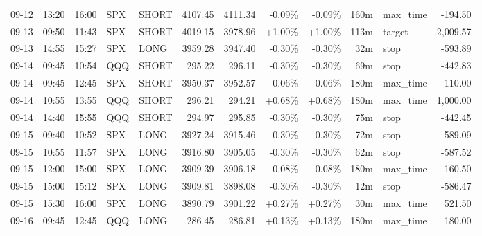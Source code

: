 \documentclass[11pt,a4paper,twoside]{article}
\begin{document}
\begin{center}
\begin{longtable}{>{\color{txtmain}}l l l l l r r r r r >{\color{txtmain}}l r}
09-12 & 13:20 & 16:00 & SPX & SHORT & 4107.45 & 4111.34 & \textcolor{lossred}{-0.09\%} & \textcolor{lossred}{-0.09\%} & 160m & max\_time & \textcolor{lossred}{-194.50} \\
09-13 & 09:50 & 11:43 & SPX & SHORT & 4019.15 & 3978.96 & \textcolor{wingreen}{+1.00\%} & \textcolor{wingreen}{+1.00\%} & 113m & target & \textcolor{wingreen}{2,009.57} \\
09-13 & 14:55 & 15:27 & SPX & LONG & 3959.28 & 3947.40 & \textcolor{lossred}{-0.30\%} & \textcolor{lossred}{-0.30\%} & 32m & stop & \textcolor{lossred}{-593.89} \\
09-14 & 09:45 & 10:54 & QQQ & SHORT & 295.22 & 296.11 & \textcolor{lossred}{-0.30\%} & \textcolor{lossred}{-0.30\%} & 69m & stop & \textcolor{lossred}{-442.83} \\
09-14 & 09:45 & 12:45 & SPX & SHORT & 3950.37 & 3952.57 & \textcolor{lossred}{-0.06\%} & \textcolor{lossred}{-0.06\%} & 180m & max\_time & \textcolor{lossred}{-110.00} \\
09-14 & 10:55 & 13:55 & QQQ & SHORT & 296.21 & 294.21 & \textcolor{wingreen}{+0.68\%} & \textcolor{wingreen}{+0.68\%} & 180m & max\_time & \textcolor{wingreen}{1,000.00} \\
09-14 & 14:40 & 15:55 & QQQ & SHORT & 294.97 & 295.85 & \textcolor{lossred}{-0.30\%} & \textcolor{lossred}{-0.30\%} & 75m & stop & \textcolor{lossred}{-442.45} \\
09-15 & 09:40 & 10:52 & SPX & LONG & 3927.24 & 3915.46 & \textcolor{lossred}{-0.30\%} & \textcolor{lossred}{-0.30\%} & 72m & stop & \textcolor{lossred}{-589.09} \\
09-15 & 10:55 & 11:57 & SPX & LONG & 3916.80 & 3905.05 & \textcolor{lossred}{-0.30\%} & \textcolor{lossred}{-0.30\%} & 62m & stop & \textcolor{lossred}{-587.52} \\
09-15 & 12:00 & 15:00 & SPX & LONG & 3909.39 & 3906.18 & \textcolor{lossred}{-0.08\%} & \textcolor{lossred}{-0.08\%} & 180m & max\_time & \textcolor{lossred}{-160.50} \\
09-15 & 15:00 & 15:12 & SPX & LONG & 3909.81 & 3898.08 & \textcolor{lossred}{-0.30\%} & \textcolor{lossred}{-0.30\%} & 12m & stop & \textcolor{lossred}{-586.47} \\
09-15 & 15:30 & 16:00 & SPX & LONG & 3890.79 & 3901.22 & \textcolor{wingreen}{+0.27\%} & \textcolor{wingreen}{+0.27\%} & 30m & max\_time & \textcolor{wingreen}{521.50} \\
09-16 & 09:45 & 12:45 & QQQ & LONG & 286.45 & 286.81 & \textcolor{wingreen}{+0.13\%} & \textcolor{wingreen}{+0.13\%} & 180m & max\_time & \textcolor{wingreen}{180.00} \\

\end{longtable}
\end{center}
\end{document}
